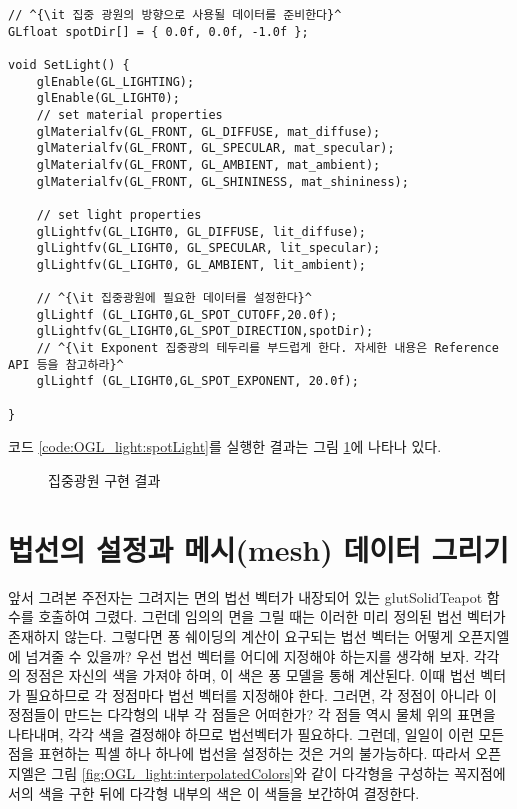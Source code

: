 \begin{algorithmbis}[집중 광원 구현하기]\label{code:OGL_light:spotLight}
\lstset{language=C++, escapechar=^} 
\begin{lstlisting}
// ^{\it 집중 광원의 방향으로 사용될 데이터를 준비한다}^
GLfloat spotDir[] = { 0.0f, 0.0f, -1.0f };

void SetLight() {
    glEnable(GL_LIGHTING);
    glEnable(GL_LIGHT0);
    // set material properties
    glMaterialfv(GL_FRONT, GL_DIFFUSE, mat_diffuse);
    glMaterialfv(GL_FRONT, GL_SPECULAR, mat_specular);
    glMaterialfv(GL_FRONT, GL_AMBIENT, mat_ambient);
    glMaterialfv(GL_FRONT, GL_SHININESS, mat_shininess);

    // set light properties
    glLightfv(GL_LIGHT0, GL_DIFFUSE, lit_diffuse);
    glLightfv(GL_LIGHT0, GL_SPECULAR, lit_specular);
    glLightfv(GL_LIGHT0, GL_AMBIENT, lit_ambient);

    // ^{\it 집중광원에 필요한 데이터를 설정한다}^    
    glLightf (GL_LIGHT0,GL_SPOT_CUTOFF,20.0f);
    glLightfv(GL_LIGHT0,GL_SPOT_DIRECTION,spotDir);
    // ^{\it Exponent 집중광의 테두리를 부드럽게 한다. 자세한 내용은 Reference API 등을 참고하라}^
    glLightf (GL_LIGHT0,GL_SPOT_EXPONENT, 20.0f);

}
\end{lstlisting}
\end{algorithmbis}

코드 \ref{code:OGL_light:spotLight}를 실행한 결과는 그림 \ref{fig:OGL_light:spotLightResult}에 나타나 있다.

\begin{figure}[h!]
  \centering
    \caption{집중광원 구현 결과}
    \label{fig:OGL_light:spotLightResult}
\end{figure}

\section{법선의 설정과 메시(mesh) 데이터 그리기}

앞서 그려본 주전자는 그려지는 면의 법선 벡터가 내장되어 있는 {\sf glutSolidTeapot} 함수를 호출하여 그렸다. 그런데 임의의 면을 그릴 때는 이러한 미리 정의된 법선 벡터가 존재하지 않는다. 그렇다면 퐁 쉐이딩의 계산이 요구되는 법선 벡터는 어떻게 오픈지엘에 넘겨줄 수 있을까?
우선 법선 벡터를 어디에 지정해야 하는지를 생각해 보자. 각각의 정점은 자신의 색을 가져야 하며, 이 색은 퐁 모델을 통해 계산된다. 이때 법선 벡터가 필요하므로 각 정점마다 법선 벡터를 지정해야 한다. 그러면, 각 정점이 아니라 이 정점들이 만드는 다각형의 내부 각 점들은 어떠한가? 각 점들 역시 물체 위의 표면을 나타내며, 각각 색을 결정해야 하므로 법선벡터가 필요하다. 그런데, 일일이 이런 모든 점을 표현하는 픽셀 하나 하나에 법선을 설정하는 것은 거의 불가능하다. 따라서 오픈지엘은 그림
\ref{fig:OGL_light:interpolatedColors}와 같이 다각형을 구성하는 꼭지점에서의 색을 구한 뒤에 다각형 내부의 색은 이 색들을 보간하여 결정한다.

